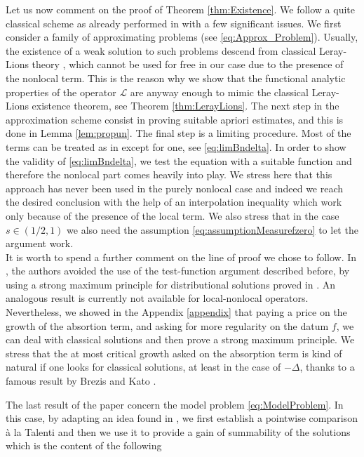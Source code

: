 \documentclass[11pt,a4paper]{amsart}
\theoremstyle{definition}
\theoremstyle{plain}
\numberwithin{equation}{section}
\begin{document}
Let us now comment on the proof of Theorem \ref{thm:Existence}. We follow a quite classical scheme as already performed in \cite{Oliva} with a few significant issues. We first consider a family of approximating problems (see \eqref{eq:Approx_Problem}). Usually, the existence of a weak solution to such problems descend from classical Leray-Lions theory \cite{LeLi}, which cannot be used for free in our case due to the presence of the nonlocal term. This is the reason why we show that the functional analytic properties of the operator $\mathcal{L}$ are anyway enough to mimic the classical Leray-Lions existence theorem, see Theorem \ref{thm:LerayLions}. The next step in the approximation scheme consist in proving suitable apriori estimates, and this is done in Lemma \ref{lem:propun}. The final step is a limiting procedure. Most of the terms can be treated as in \cite{Oliva} except for one, see \eqref{eq:limBndelta}. In order to show the validity of \eqref{eq:limBndelta}, we test the equation with a suitable function and therefore the nonlocal part comes heavily into play. We stress here that this approach has never been used in the purely nonlocal case and indeed we reach the desired conclusion with the help of an interpolation inequality which work only because of the presence of the local term. We also stress that in the case $s \in (1/2,1)$ we also need the assumption \eqref{eq:assumptionMeasurefzero} to let the argument work.\\
\noindent It is worth to spend a further comment on the line of proof we chose to follow. In \cite{DeCOl}, the authors avoided the use of the test-function argument described before, by using a strong maximum principle for distributional solutions proved in \cite{Vazquez}. An analogous result is currently not available for local-nonlocal operators. Nevertheless, we showed in the Appendix \ref{appendix} that paying a price on the growth of the absortion term, and asking for more regularity on the datum $f$, we can deal with classical solutions and then prove a strong maximum principle. We stress that the at most critical growth asked on the absorption term is kind of natural if one looks for classical solutions, at least in the case of $-\Delta$, thanks to a famous result by Brezis and Kato \cite{BrezisKato}.

\medskip

The last result of the paper concern the model problem \eqref{eq:ModelProblem}. In this case, by adapting an idea found in \cite{BCT}, we first establish a pointwise comparison \`a la Talenti and then we use it to provide a gain of summability of the solutions which is the content of the following
\end{document}
